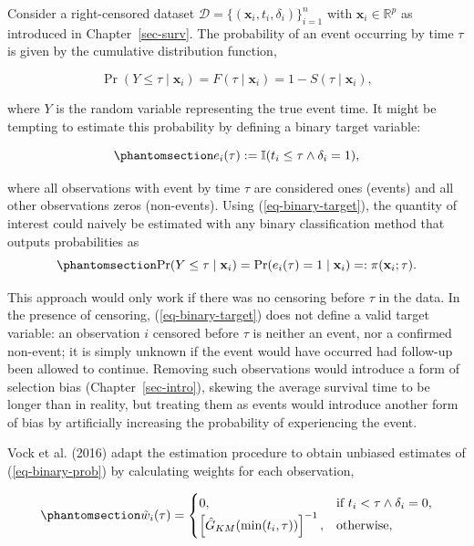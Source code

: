 \documentclass[
  letterpaper,
  krantz2]{style/krantz}
\begin{document}
Consider a right-censored dataset
\(\mathcal{D}= \{(\mathbf{x}_i, t_i, \delta_i)\}_{i=1}^n\) with
\(\mathbf{x}_i \in \mathbb{R}^p\) as introduced in
Chapter~\ref{sec-surv}. The probability of an event occurring by time
\(\tau\) is given by the cumulative distribution function,

\[
\Pr(Y \leq \tau \mid \mathbf{x}_i) = F(\tau \mid \mathbf{x}_i) = 1-S(\tau \mid \mathbf{x}_i),
\]

where \(Y\) is the random variable representing the true event time. It
might be tempting to estimate this probability by defining a binary
target variable:

\begin{equation}\phantomsection\label{eq-binary-target}{
e_i(\tau):= \mathbb{I}(t_i \leq \tau \wedge \delta_i = 1),
}\end{equation}

where all observations with event by time \(\tau\) are considered ones
(events) and all other observations zeros (non-events). Using
(\ref{eq-binary-target}), the quantity of interest could naively be
estimated with any binary classification method that outputs
probabilities as \begin{equation}\phantomsection\label{eq-binary-prob}{
\Pr(Y \leq \tau \mid \mathbf{x}_i) = \Pr(e_i(\tau) = 1 \mid \mathbf{x}_i) =: \pi(\mathbf{x}_i;\tau).
}\end{equation}

This approach would only work if there was no censoring before \(\tau\)
in the data. In the presence of censoring, (\ref{eq-binary-target}) does
not define a valid target variable: an observation \(i\) censored before
\(\tau\) is neither an event, nor a confirmed non-event; it is simply
unknown if the event would have occurred had follow-up been allowed to
continue. Removing such observations would introduce a form of selection
bias (Chapter~\ref{sec-intro}), skewing the average survival time to be
longer than in reality, but treating them as events would introduce
another form of bias by artificially increasing the probability of
experiencing the event.

Vock et al. (2016) adapt the estimation procedure to obtain unbiased
estimates of (\ref{eq-binary-prob}) by calculating weights for each
observation,

\begin{equation}\phantomsection\label{eq-adapted-ipc-weights}{
\tilde{w}_i(\tau) = \begin{cases}
0, & \text{if } t_i < \tau \wedge \delta_i = 0,\\
\left[\hat{G}_{KM}(\min(t_i, \tau))\right]^{-1}, & \text{otherwise},
\end{cases}
}\end{equation}
\end{document}
